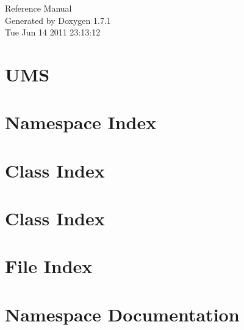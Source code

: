 \documentclass[a4paper]{book}
\begin{document}
\hypersetup{pageanchor=false}
\begin{titlepage}
\vspace*{7cm}
\begin{center}
{\Large Reference Manual}\\
\vspace*{1cm}
{\large Generated by Doxygen 1.7.1}\\
\vspace*{0.5cm}
{\small Tue Jun 14 2011 23:13:12}\\
\end{center}
\end{titlepage}
\clearemptydoublepage
{}
\tableofcontents
\clearemptydoublepage
{}
\hypersetup{pageanchor=true}
\chapter{UMS}
\label{index}\hypertarget{index}{}
\chapter{Namespace Index}

\chapter{Class Index}

\chapter{Class Index}

\chapter{File Index}

\chapter{Namespace Documentation}

\end{document}
